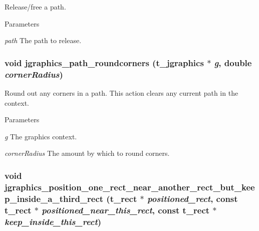 Release/free a path. 
\begin{DoxyParams}{Parameters}
\item[{\em path}]The path to release. \end{DoxyParams}
\hypertarget{group__jgraphics_ga51efbf384c6dd4504c9575447dbaaa53}{
\subsubsection[{jgraphics\_\-path\_\-roundcorners}]{\setlength{\rightskip}{0pt plus 5cm}void jgraphics\_\-path\_\-roundcorners ({\bf t\_\-jgraphics} $\ast$ {\em g}, \/  double {\em cornerRadius})}}
\label{group__jgraphics_ga51efbf384c6dd4504c9575447dbaaa53}


Round out any corners in a path. This action clears any current path in the context.


\begin{DoxyParams}{Parameters}
\item[{\em g}]The graphics context. \item[{\em cornerRadius}]The amount by which to round corners. \end{DoxyParams}
\hypertarget{group__jgraphics_ga5b4eb24b41c116e3324b2da40541f8eb}{
\subsubsection[{jgraphics\_\-position\_\-one\_\-rect\_\-near\_\-another\_\-rect\_\-but\_\-keep\_\-inside\_\-a\_\-third\_\-rect}]{\setlength{\rightskip}{0pt plus 5cm}void jgraphics\_\-position\_\-one\_\-rect\_\-near\_\-another\_\-rect\_\-but\_\-keep\_\-inside\_\-a\_\-third\_\-rect ({\bf t\_\-rect} $\ast$ {\em positioned\_\-rect}, \/  const {\bf t\_\-rect} $\ast$ {\em positioned\_\-near\_\-this\_\-rect}, \/  const {\bf t\_\-rect} $\ast$ {\em keep\_\-inside\_\-this\_\-rect})}}
\label{group__jgraphics_ga5b4eb24b41c116e3324b2da40541f8eb}


